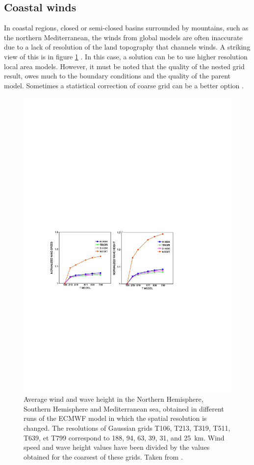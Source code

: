 \subsection{Coastal winds}
In coastal regions, closed or semi-closed basins surrounded by mountains, such as the northern Mediterranean, the winds 
from global models are often inaccurate due to a lack of resolution of the land topography that channels winds. 
A striking view of this is in figure 
\ref{wind_Cavaleri} \citep{Cavaleri&Bertotti2006}. In this case, a solution can be to use higher resolution local area models. 
However, it must be noted that the quality of the nested grid result, owes much to the boundary conditions and 
the quality of the parent model. Sometimes a statistical correction of coarse grid can be a better option \citep{Signell&al.2005}.
\begin{figure}
\centerline{\includegraphics[width=\textwidth]{FIGS_CH_MODEL/Cavaleri_Bertotti_U10_Hs.pdf}}
\caption{Average wind and wave height in the Northern Hemisphere, Southern Hemisphere and Mediterranean sea, 
obtained in different runs of the ECMWF model in which the spatial resolution is changed. The resolutions of Gaussian grids 
T106, T213, T319, T511, T639, et T799 correspond to 
188, 94, 63, 39, 31, and 25~km. Wind speed and wave height values have been divided by the values obtained for the coarsest 
of these grids. Taken from \cite[][\copyright Elsevier]{Cavaleri&Bertotti2006}.}
\label{wind_Cavaleri}
\end{figure}
